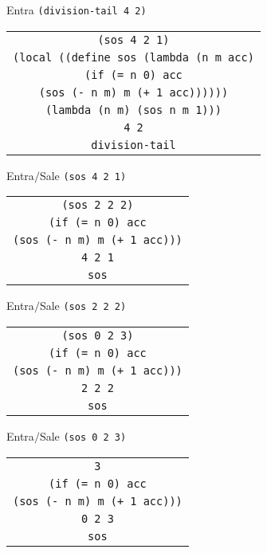 \documentclass[letterpaper,11pt]{article}
\begin{document}
\begin{enumerate}
    Entra \texttt{(division-tail 4 2)}
    \begin{center}
        \begin{tabular}[h]{|c|}
            \hline
            \texttt{(sos 4 2 1)} \\
            \texttt{(local ((define sos 
                              (lambda (n m acc)} \\
            \texttt{(if (= n 0)
                        acc} \\
            \texttt{(sos (- n m) m (+ 1 acc))))))} \\  
            \texttt{(lambda (n m)
                      (sos n m 1)))} \\
            \texttt{4 2} \\ 
            \texttt{division-tail} \\
            \hline
        \end{tabular}
    \end{center}

    Entra$/$Sale \texttt{(sos 4 2 1)}
    \begin{center}
        \begin{tabular}[h]{|c|}
            \hline
            \texttt{(sos 2 2 2)} \\
            \texttt{(if (= n 0)
                        acc} \\
            \texttt{(sos (- n m) m (+ 1 acc)))} \\ 
            \texttt{4 2 1} \\
            \texttt{sos} \\
            \hline
        \end{tabular}
    \end{center}

    Entra$/$Sale \texttt{(sos 2 2 2)}
    \begin{center}
        \begin{tabular}[h]{|c|}
            \hline
            \texttt{(sos 0 2 3)} \\
            \texttt{(if (= n 0)
                        acc} \\
            \texttt{(sos (- n m) m (+ 1 acc)))} \\ 
            \texttt{2 2 2} \\
            \texttt{sos} \\
            \hline
        \end{tabular}
    \end{center}

    Entra$/$Sale \texttt{(sos 0 2 3)}
    \begin{center}
        \begin{tabular}[h]{|c|}
            \hline
            \texttt{3} \\
            \texttt{(if (= n 0)
                        acc} \\
            \texttt{(sos (- n m) m (+ 1 acc)))} \\ 
            \texttt{0 2 3} \\
            \texttt{sos} \\
            \hline
        \end{tabular}
    \end{center}


\end{enumerate}
\end{document}
